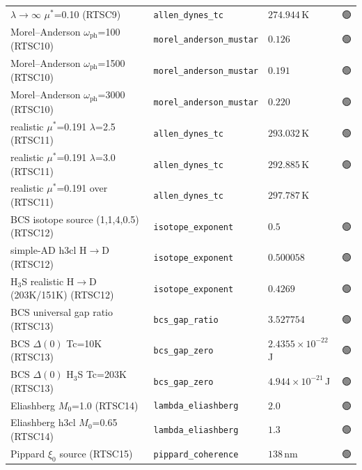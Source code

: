 \documentclass[11pt,a4paper]{article}
\providecommand{\tierGreen}{🟢}
\providecommand{\tierRed}{🔴}
\begin{document}
\begin{table}[h]
\begin{tabular}{@{}lllc@{}}
$\lambda\!\to\!\infty$ $\mu^*$=0.10 (RTSC9)                 & \texttt{allen\_dynes\_tc}        & $274.944$\,K     & \tierGreen \\
Morel--Anderson $\omega_{\text{ph}}$=100  (RTSC10)          & \texttt{morel\_anderson\_mustar} & $0.126$          & \tierGreen \\
Morel--Anderson $\omega_{\text{ph}}$=1500 (RTSC10)          & \texttt{morel\_anderson\_mustar} & $0.191$          & \tierGreen \\
Morel--Anderson $\omega_{\text{ph}}$=3000 (RTSC10)          & \texttt{morel\_anderson\_mustar} & $0.220$          & \tierGreen \\
realistic $\mu^*$=0.191 $\lambda$=2.5 (RTSC11)              & \texttt{allen\_dynes\_tc}        & $293.032$\,K     & \tierGreen \\
realistic $\mu^*$=0.191 $\lambda$=3.0 (RTSC11)              & \texttt{allen\_dynes\_tc}        & $292.885$\,K     & \tierGreen \\
realistic $\mu^*$=0.191 over (RTSC11)                       & \texttt{allen\_dynes\_tc}        & $297.787$\,K     & \tierRed   \\
BCS isotope source (1,1,4,0.5) (RTSC12)                     & \texttt{isotope\_exponent}      & $0.5$            & \tierGreen \\
simple-AD h3cl H$\to$D (RTSC12)                             & \texttt{isotope\_exponent}      & $0.500058$       & \tierGreen \\
H$_3$S realistic H$\to$D (203K/151K) (RTSC12)               & \texttt{isotope\_exponent}      & $0.4269$         & \tierGreen \\
BCS universal gap ratio (RTSC13)                            & \texttt{bcs\_gap\_ratio}        & $3.527754$       & \tierGreen \\
BCS $\Delta(0)$ Tc=10K (RTSC13)                             & \texttt{bcs\_gap\_zero}         & $2.4355\!\!\times\!\!10^{-22}$\,J & \tierGreen \\
BCS $\Delta(0)$ H$_3$S Tc=203K (RTSC13)                     & \texttt{bcs\_gap\_zero}         & $4.944\!\!\times\!\!10^{-21}$\,J  & \tierGreen \\
Eliashberg $M_0$=1.0 (RTSC14)                               & \texttt{lambda\_eliashberg}     & $2.0$            & \tierGreen \\
Eliashberg h3cl $M_0$=0.65 (RTSC14)                         & \texttt{lambda\_eliashberg}     & $1.3$            & \tierGreen \\
Pippard $\xi_0$ source (RTSC15)                             & \texttt{pippard\_coherence}     & $138$\,nm        & \tierGreen \\

\end{tabular}
\end{table}
\end{document}
